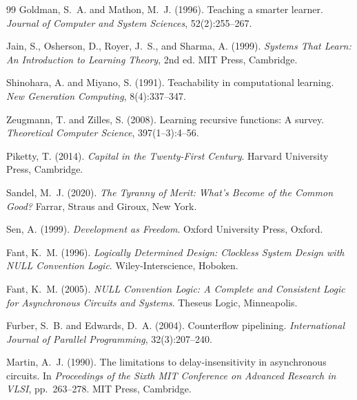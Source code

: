 \documentclass[12pt, oneside]{book}
\theoremstyle{flyxion}
\theoremstyle{definition}
\begin{document}
\begin{thebibliography}{99}
Goldman, S.~A. and Mathon, M.~J. (1996).
\newblock Teaching a smarter learner.
\newblock \textit{Journal of Computer and System Sciences},
  52(2):255--267.

Jain, S., Osherson, D., Royer, J.~S., and Sharma, A. (1999).
\newblock \textit{Systems That Learn: An Introduction to Learning Theory},
  2nd ed.
\newblock MIT Press, Cambridge.

Shinohara, A. and Miyano, S. (1991).
\newblock Teachability in computational learning.
\newblock \textit{New Generation Computing}, 8(4):337--347.

Zeugmann, T. and Zilles, S. (2008).
\newblock Learning recursive functions: A survey.
\newblock \textit{Theoretical Computer Science}, 397(1--3):4--56.


Piketty, T. (2014).
\newblock \textit{Capital in the Twenty-First Century}.
\newblock Harvard University Press, Cambridge.

Sandel, M.~J. (2020).
\newblock \textit{The Tyranny of Merit: What's Become of the Common Good?}
\newblock Farrar, Straus and Giroux, New York.

Sen, A. (1999).
\newblock \textit{Development as Freedom}.
\newblock Oxford University Press, Oxford.


Fant, K.~M. (1996).
\newblock \textit{Logically Determined Design: Clockless System Design with
  NULL Convention Logic}.
\newblock Wiley-Interscience, Hoboken.

Fant, K.~M. (2005).
\newblock \textit{NULL Convention Logic: A Complete and Consistent Logic for
  Asynchronous Circuits and Systems}.
\newblock Theseus Logic, Minneapolis.

Furber, S.~B. and Edwards, D.~A. (2004).
\newblock Counterflow pipelining.
\newblock \textit{International Journal of Parallel Programming},
  32(3):207--240.

Martin, A.~J. (1990).
\newblock The limitations to delay-insensitivity in asynchronous circuits.
\newblock In \textit{Proceedings of the Sixth MIT Conference on Advanced
  Research in VLSI}, pp.\ 263--278. MIT Press, Cambridge.


\end{thebibliography}
\end{document}

